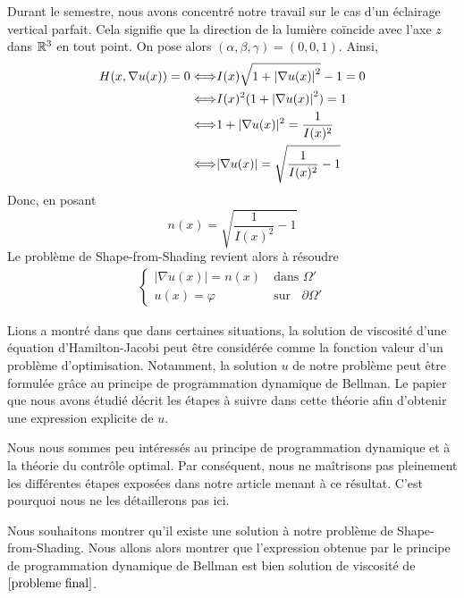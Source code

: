 Durant le semestre, nous avons concentré notre travail sur le cas d'un éclairage vertical parfait. Cela signifie que la direction de la lumière coïncide avec l'axe $z$ dans $\mathbb{R}^3$ en tout point. 
On pose alors $(\alpha,\beta,\gamma) = (0,0,1)$.
Ainsi,
\begin{equation*}
    \begin{split}
        H(x,\nabla u(x)) = 0 \Longleftrightarrow& I(x)\sqrt{1+{\mathopen{}\left|\nabla u(x)\right|\mathclose{}}^2} -1 =0\\
        \Longleftrightarrow& I(x)^2(1+{\mathopen{}\left|\nabla u(x)\right|\mathclose{}}^2) = 1\\
        \Longleftrightarrow& 1+\mathopen{}\left|\nabla u(x)\right|\mathclose{}^2 = \dfrac{1}{I(x)^2}\\
        \Longleftrightarrow& \mathopen{}\left|\nabla u(x)\right|\mathclose{} = \sqrt{\dfrac{1}{I(x)^2} -1}
    \end{split}
\end{equation*}
Donc, en posant 
\begin{equation*}
    n(x) = \sqrt{\dfrac{1}{I(x)^2} -1}
\end{equation*}
Le problème de Shape-from-Shading revient alors à résoudre 
\begin{align}\label{probleme final}
    \left\{\begin{array}{ll}
         \mathopen{}\left|\nabla u(x)\right|\mathclose{}=n(x)& \ \text{dans } \Omega'\\  
         u(x)=\varphi& \ \text{sur } \mathop{}\!{\partial}\Omega'
    \end{array}
    \right.
\end{align}


Lions a montré dans \cite{Lions} que dans certaines situations, la solution de viscosité d'une équation d'Hamilton-Jacobi peut être considérée comme la fonction valeur d'un problème d'optimisation. Notamment, la solution $u$ de notre problème peut être formulée grâce au principe de programmation dynamique de Bellman. Le papier que nous avons étudié décrit les étapes à suivre dans cette théorie afin d'obtenir une expression explicite de $u$. 

\begin{noremark}
    Nous nous sommes peu intéressés au principe de programmation dynamique et à la théorie du contrôle optimal. Par conséquent, nous ne maîtrisons pas pleinement les différentes étapes exposées dans notre article menant à ce résultat.  C'est pourquoi nous ne les détaillerons pas ici.
\end{noremark}

Nous souhaitons montrer qu'il existe une solution à notre problème de Shape-from-Shading. Nous allons alors montrer que l'expression obtenue par le principe de programmation dynamique de Bellman est bien solution de viscosité de $\eqref{probleme final}$. 

